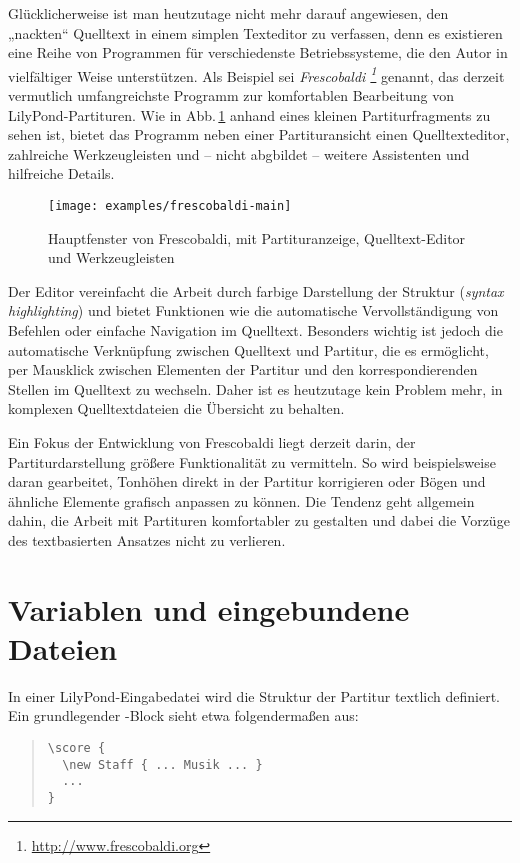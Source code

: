 \documentclass[DIV=12]{scrreprt}
\begin{document}
\bigskip
Glücklicherweise ist man heutzutage nicht mehr darauf angewiesen, den „nackten“ Quelltext in einem simplen Texteditor zu verfassen, denn es existieren eine Reihe von Programmen für verschiedenste Betriebssysteme, die den Autor in vielfältiger Weise unterstützen.
Als Beispiel sei \textit{Frescobaldi%
\footnote{\url{http://www.frescobaldi.org}}}
genannt, das derzeit vermutlich umfangreichste Programm zur komfortablen Bearbeitung von LilyPond-Partituren.
Wie in Abb.\,\ref{fig:pt_fb-main-window} anhand eines kleinen Partiturfragments zu sehen ist, bietet das Programm neben einer Partituransicht einen Quelltexteditor, zahlreiche Werkzeugleisten und -- nicht abgbildet -- weitere Assistenten und hilfreiche Details.
	\begin{figure}
	\texttt{[image: examples/frescobaldi-main]}
	\caption{Hauptfenster von Frescobaldi, mit Partituranzeige, Quelltext-Editor und Werkzeugleisten}
	\label{fig:pt_fb-main-window}
	\end{figure}
Der Editor vereinfacht die Arbeit durch farbige Darstellung der Struktur (\emph{syntax highlighting}) und bietet Funktionen wie die automatische Vervollständigung von Befehlen oder einfache Navigation im Quelltext.
Besonders wichtig ist jedoch die automatische Verknüpfung zwischen Quelltext und Partitur, die es ermöglicht, per Mausklick zwischen Elementen der Partitur und den korrespondierenden Stellen im Quelltext zu wechseln.
Daher ist es heutzutage kein Problem mehr, in komplexen Quelltextdateien die Übersicht zu behalten.

Ein Fokus der Entwicklung von Frescobaldi liegt derzeit darin, der Partiturdarstellung größere Funktionalität zu vermitteln.
So wird beispielsweise daran gearbeitet, Tonhöhen direkt in der Partitur  korrigieren oder Bögen und ähnliche Elemente grafisch anpassen zu können.
Die Tendenz geht allgemein dahin, die Arbeit mit Partituren komfortabler zu gestalten und dabei die Vorzüge des textbasierten Ansatzes nicht zu verlieren.

\section{Variablen und eingebundene Dateien}
\label{sec:pt_variables-includes}
In einer LilyPond-Eingabedatei wird die Struktur der Partitur textlich definiert.
Ein grundlegender -Block sieht etwa folgendermaßen aus:

\begin{quote}
\begin{minipage}{\textwidth}
\begin{verbatim}
\score {
  \new Staff { ... Musik ... }
  ...
}
\end{verbatim}
\end{minipage}
\end{quote}
\end{document}
